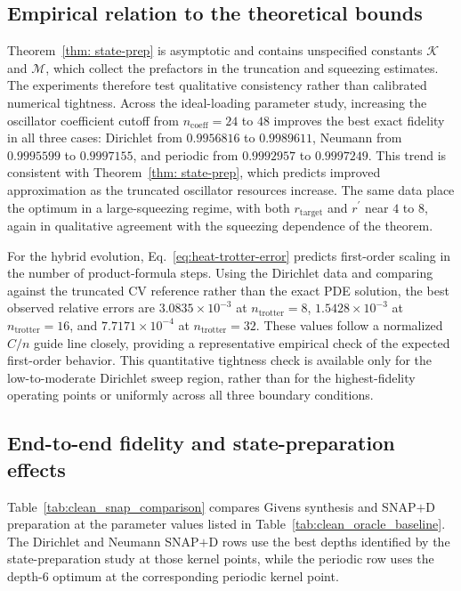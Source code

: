 \subsection{Empirical relation to the theoretical bounds}

Theorem~\ref{thm: state-prep} is asymptotic and contains unspecified constants $\mathcal K$ and $\mathcal M$, which collect the prefactors in the truncation and squeezing estimates. The experiments therefore test qualitative consistency rather than calibrated numerical tightness. Across the ideal-loading parameter study, increasing the oscillator coefficient cutoff from $n_{\mathrm{coeff}}=24$ to $48$ improves the best exact fidelity in all three cases: Dirichlet from $0.9956816$ to $0.9989611$, Neumann from $0.9995599$ to $0.9997155$, and periodic from $0.9992957$ to $0.9997249$. This trend is consistent with Theorem~\ref{thm: state-prep}, which predicts improved approximation as the truncated oscillator resources increase. The same data place the optimum in a large-squeezing regime, with both $r_{\mathrm{target}}$ and $r^\prime$ near $4$ to $8$, again in qualitative agreement with the squeezing dependence of the theorem.

For the hybrid evolution, Eq.~\eqref{eq:heat-trotter-error} predicts first-order scaling in the number of product-formula steps. Using the Dirichlet data and comparing against the truncated CV reference rather than the exact PDE solution, the best observed relative errors are $3.0835\times 10^{-3}$ at $n_{\mathrm{trotter}}=8$, $1.5428\times 10^{-3}$ at $n_{\mathrm{trotter}}=16$, and $7.7171\times 10^{-4}$ at $n_{\mathrm{trotter}}=32$. These values follow a normalized $C/n$ guide line closely, providing a representative empirical check of the expected first-order behavior. This quantitative tightness check is available only for the low-to-moderate Dirichlet sweep region, rather than for the highest-fidelity operating points or uniformly across all three boundary conditions.


\subsection{End-to-end fidelity and state-preparation effects}

Table~\ref{tab:clean_snap_comparison} compares Givens synthesis and SNAP$+$D preparation at the parameter values listed in Table~\ref{tab:clean_oracle_baseline}. The Dirichlet and Neumann SNAP$+$D rows use the best depths identified by the state-preparation study at those kernel points, while the periodic row uses the depth-$6$ optimum at the corresponding periodic kernel point.

